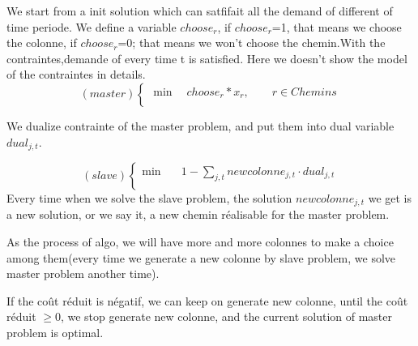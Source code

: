 \documentclass[a4paper]{article}
\begin{document}
We start from a init solution which can satfifait all the demand of different of time periode. We define a variable $choose_r$, if $choose_r$=1, that means we choose the colonne, if $choose_r$=0;
that means we won't choose the chemin.With the contraintes,demande of every time t is satisfied. Here we doesn't show the model of the contraintes in details.
\begin{equation*}
    (master) \left\{ 
    \begin{aligned}
    \min\quad   choose_{r}*x_{r} , \qquad r \in Chemins \\
  \end{aligned}
\right.
\end{equation*}

We dualize contrainte of the master problem, and put them into dual variable $dual_{j,t}$.  

\begin{equation*}
    (slave) \left\{ 
    \begin{aligned}
    \min\quad  & 1-\sum_{j,t} newcolonne_{j,t}\cdot dual_{j,t}\\
  \end{aligned}
\right.
\end{equation*}
Every time when we solve the slave problem, the solution $newcolonne_{j,t}$ we get is a new solution, or we say it, a new chemin réalisable for the master problem.

As the process of algo, we will have more and more colonnes to make a choice among them(every time we generate a new colonne by slave problem, we solve master problem another time).

If the coût réduit is négatif, we can keep on generate new colonne, until the coût réduit $\geq$0, we stop generate new colonne, and the current solution of master problem is optimal.
\end{document}
